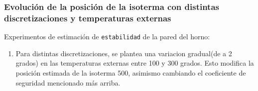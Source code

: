 \subsubsection{Evolución de la posición de la isoterma con distintas discretizaciones y temperaturas externas}
Experimentos de estimación de \texttt{estabilidad} de la pared del horno:
\begin{enumerate}
    \item Para distintas discretizaciones, se plantea una variacion gradual(de a 2 grados) en las temperaturas externas entre 100 y 300 grados. Esto modifica la posición estimada de la isoterma 500, asimismo cambiando el coeficiente de seguridad mencionado más arriba.
\end{enumerate}